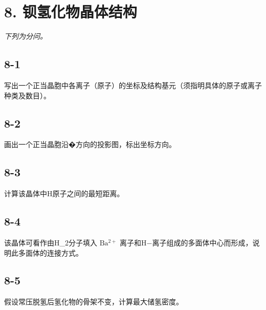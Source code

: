 \section*{8. 钡氢化物晶体结构}
\textit{下列为分问。}

\subsection*{8-1}
写出⼀个正当晶胞中各离⼦（原⼦）的坐标及结构基元（须指明具体的原⼦或离⼦种类及数⽬）。

\subsection*{8-2}
画出⼀个正当晶胞沿�⽅向的投影图，标出坐标⽅向。

\subsection*{8-3}
计算该晶体中H原⼦之间的最短距离。

\subsection*{8-4}
该晶体可看作由H_{2}分⼦填⼊ $\mathrm { B a ^ { 2 + } }$ 离⼦和H−离⼦组成的多⾯体中⼼⽽形成，说明此多⾯体的连接⽅式。

\subsection*{8-5}
假设常压脱氢后氢化物的⻣架不变，计算最⼤储氢密度。
